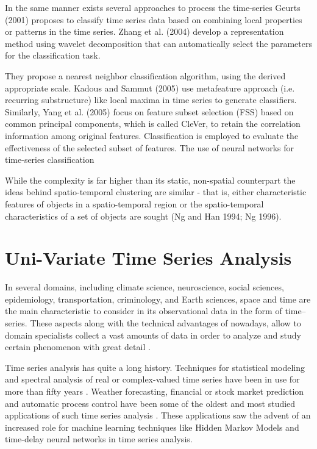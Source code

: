 In the same manner exists several approaches to process the time-series Geurts (2001) proposes to classify time series data based on combining local properties or patterns in the time series. Zhang et al. (2004) develop a representation method using wavelet decomposition that can automatically select the parameters for the classification task. 

They propose a nearest neighbor classification algorithm, using the derived appropriate scale. Kadous and Sammut (2005) use metafeature approach (i.e. recurring substructure) like local maxima in time series to generate classifiers. Similarly, Yang et al. (2005) focus on feature subset selection (FSS) based on common principal components, which is called CleVer, to retain the correlation information among original features. Classification is employed to evaluate the effectiveness of the selected subset of features. 
The use of neural networks for time-series classification

 While the complexity is far higher than its static, non-spatial counterpart the ideas behind spatio-temporal clustering are similar - that is, either characteristic features of objects in a spatio-temporal region or the spatio-temporal characteristics of a set of objects are sought (Ng and Han 1994; Ng 1996).

\section{Uni-Variate Time Series Analysis}
\label{Sec:TSAnalysis}

In several domains, including climate science, neuroscience, social sciences, epidemiology, transportation, criminology, and Earth sciences, space and time are the main characteristic to consider in its observational data in the form of time--series. These aspects along with the technical advantages of nowadays, allow to domain specialists collect a vast amounts of data in order to analyze and study certain phenomenon with great detail \cite{}. 

Time series analysis has quite a long history. Techniques for statistical modeling and spectral analysis of real or complex-valued time series have been in use for more than fifty years \cite{Hyndman2006, Chatfield2019}. Weather forecasting, financial or stock market prediction and automatic process control have been some of the oldest and most studied applications of such time series analysis \cite{Box1976}. These applications saw the advent of an increased role for machine learning techniques like Hidden Markov Models and time-delay neural networks in time series analysis.

